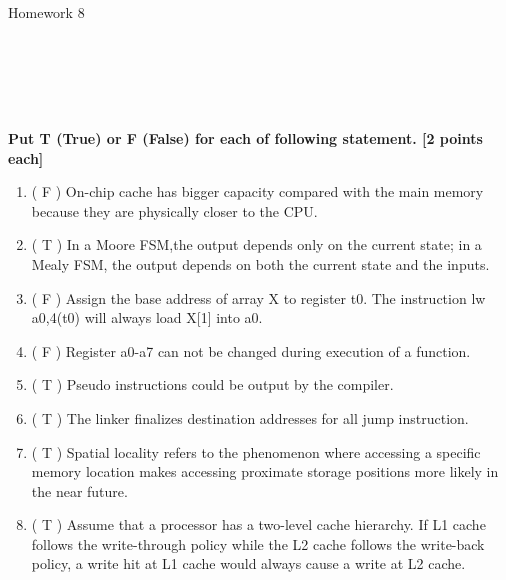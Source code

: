 \documentclass[addpoints, 12pt, answers]{exam}
\begin{document}
\begin{center}

{\centering \Large Homework 8\\\vspace{.75cm}}

\vspace{0.1cm}
\\[0.6cm]
\\[0.6cm]
\\[0.6cm]
\\[0.5cm]

\end{center}


\begin{questions}

\question[20] \textbf{Put T (True) or F (False) for each of following statement. [2 points each]}

\begin{enumerate}[(1)]
    \item ( F ) On-chip cache has bigger capacity compared with the main memory because they are physically closer to the CPU.

    \item ( T ) In a Moore FSM,the output depends only on the current state; in a Mealy FSM, the output depends on both the current state and the inputs.
    
    \item ( F ) Assign the base address of array X to register t0. The instruction lw a0,4(t0) will always load X[1] into a0.

    \item ( F ) Register a0-a7 can not be changed during execution of a function.

    \item ( T ) Pseudo instructions could be output by the compiler.

    \item ( T ) The linker finalizes destination addresses for all jump instruction.

    \item ( T ) Spatial locality refers to the phenomenon where accessing a specific memory location makes accessing proximate storage positions more likely in the near future.

    \item ( T ) Assume that a processor has a two-level cache hierarchy. If L1 cache follows the write-through policy while the L2 cache follows the write-back policy, a write hit at L1 cache would always cause a write at L2 cache. 


\end{enumerate}
\end{questions}
\end{document}
